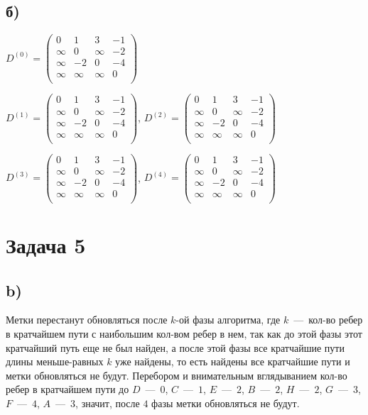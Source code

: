 \documentclass[a4paper,12pt]{article} %
\begin{document}
\subsection{б)}
\hspace{5mm}
$D^{(0)}=\begin{pmatrix}
	0 & 1 & 3 & -1 \\
	\infty & 0 & \infty & -2 \\
	\infty & -2 & 0 & -4 \\
	\infty & \infty & \infty & 0 \\
\end{pmatrix}$

$D^{(1)}=\begin{pmatrix}
0 & 1 & 3 & -1 \\
\infty & 0 & \infty & -2 \\
\infty & -2 & 0 & -4 \\
\infty & \infty & \infty & 0 \\
\end{pmatrix}$, $D^{(2)}=\begin{pmatrix}
0 & 1 & 3 & -1 \\
\infty & 0 & \infty & -2 \\
\infty & -2 & 0 & -4 \\
\infty & \infty & \infty & 0 \\
\end{pmatrix}$

$D^{(3)}=\begin{pmatrix}
0 & 1 & 3 & -1 \\
\infty & 0 & \infty & -2 \\
\infty & -2 & 0 & -4 \\
\infty & \infty & \infty & 0 \\
\end{pmatrix}$, $D^{(4)}=\begin{pmatrix}
0 & 1 & 3 & -1 \\
\infty & 0 & \infty & -2 \\
\infty & -2 & 0 & -4 \\
\infty & \infty & \infty & 0 \\
\end{pmatrix}$

\section{Задача 5}
\subsection{b)}
\hspace{5mm}
Метки перестанут обновляться после $k$-ой фазы алгоритма, где $k$~---~кол-во ребер в кратчайшем пути с наибольшим кол-вом ребер в нем, так как до этой фазы этот кратчайший путь еще не был найден, а после этой фазы все кратчайшие пути длины меньше-равных $k$ уже найдены, то есть найдены все кратчайшие пути и метки обновляться не будут. Перебором и внимательным вглядыванием кол-во ребер в кратчайшем пути до $D$~---~$0$, $C$~---~$1$, $E$~---~$2$, $B$~---~$2$, $H$~---~$2$, $G$~---~$3$, $F$~---~$4$, $A$~---~$3$, значит, после $4$ фазы метки обновляться не будут.
\end{document}
